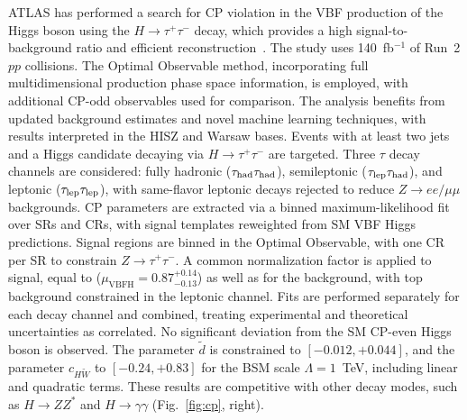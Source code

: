 \documentclass[a4paper,11pt]{article}
\begin{document}
ATLAS has performed a search for CP violation in the VBF production of
the Higgs boson using the $H \to \tau^+\tau^-$ decay, which provides a
high signal-to-background ratio and efficient
reconstruction~\cite{httcp-atlas}. The study uses 140~fb$^{-1}$ of
Run~2 $pp$ collisions. The Optimal Observable method, incorporating
full multidimensional production phase space information, is employed,
with additional CP-odd observables used for comparison. The analysis
benefits from updated background estimates and novel machine learning
techniques, with results interpreted in the HISZ and Warsaw bases.
%
Events with at least two jets and a Higgs candidate decaying via
$H\to\tau^+\tau^-$ are targeted. Three $\tau$ decay channels are
considered: fully hadronic ($\tau_{\rm had}\tau_{\rm had}$),
semileptonic ($\tau_{\rm lep}\tau_{\rm had}$), and leptonic
($\tau_{\rm lep}\tau_{\rm lep}$), with same-flavor leptonic decays
rejected to reduce $Z\to ee/\mu\mu$ backgrounds.
%
CP parameters are extracted via a binned maximum-likelihood fit over
SRs and CRs, with signal templates reweighted from SM VBF Higgs
predictions.  Signal regions are binned in the Optimal Observable,
with one CR per SR to constrain $Z\to\tau^+\tau^-$. A common
normalization factor is applied to signal, equal to
($\mu_\mathrm{VBFH}=0.87^{+0.14}_{-0.13}$) as well as for the
background, with top background constrained in the leptonic
channel. Fits are performed separately for each decay channel and
combined, treating experimental and theoretical uncertainties as
correlated.
%
No significant deviation from the SM CP-even Higgs boson is
observed. The parameter $\tilde{d}$ is constrained to
$[-0.012,+0.044]$, and the parameter $c_{H\tilde{W}}$ to
$[-0.24,+0.83]$ for the BSM scale $\Lambda = 1$~TeV, including linear
and quadratic terms. These results are competitive with other decay
modes, such as $H\to ZZ^*$ and $H\to\gamma\gamma$ (Fig.~\ref{fig:cp},
right).
\end{document}
